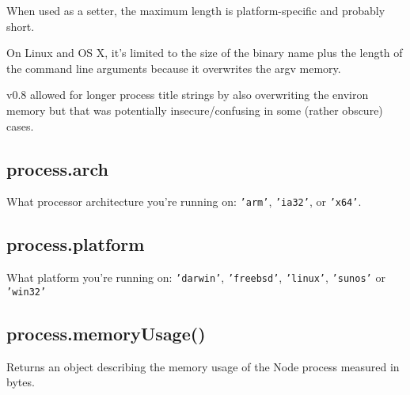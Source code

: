 When used as a setter, the maximum length is platform-specific and
probably short.

On Linux and OS X, it's limited to the size of the binary name plus the
length of the command line arguments because it overwrites the argv
memory.

v0.8 allowed for longer process title strings by also overwriting the
environ memory but that was potentially insecure/confusing in some
(rather obscure) cases.

\subsection{process.arch}\label{process.arch}

What processor architecture you're running on: \texttt{'arm'},
\texttt{'ia32'}, or \texttt{'x64'}.

\begin{Shaded}
\begin{Highlighting}[]
\NormalTok{(} \NormalTok{+ }\NormalTok{);}
\end{Highlighting}
\end{Shaded}

\subsection{process.platform}\label{process.platform}

What platform you're running on: \texttt{'darwin'}, \texttt{'freebsd'},
\texttt{'linux'}, \texttt{'sunos'} or \texttt{'win32'}

\begin{Shaded}
\begin{Highlighting}[]
\NormalTok{(} \NormalTok{+ }\NormalTok{);}
\end{Highlighting}
\end{Shaded}

\subsection{process.memoryUsage()}\label{process.memoryusage}

Returns an object describing the memory usage of the Node process
measured in bytes.

